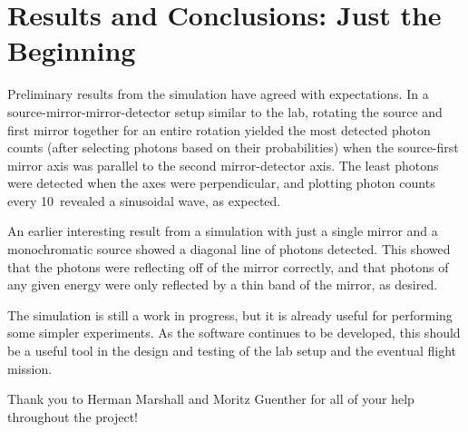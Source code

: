 \documentclass[manuscript]{aastex}
\begin{document}
\section{Results and Conclusions: Just the Beginning}

Preliminary results from the simulation have agreed with expectations. In a source-mirror-mirror-detector setup similar to the lab, rotating the source and first mirror together for an entire rotation yielded the most detected photon counts (after selecting photons based on their probabilities) when the source-first mirror axis was parallel to the second mirror-detector axis. The least photons were detected when the axes were perpendicular, and plotting photon counts every 10\degr\ revealed a sinusoidal wave, as expected.

An earlier interesting result from a simulation with just a single mirror and a monochromatic source showed a diagonal line of photons detected. This showed that the photons were reflecting off of the mirror correctly, and that photons of any given energy were only reflected by a thin band of the mirror, as desired.

The simulation is still a work in progress, but it is already useful for performing some simpler experiments. As the software continues to be developed, this should be a useful tool in the design and testing of the lab setup and the eventual flight mission.

\acknowledgments

Thank you to Herman Marshall and Moritz Guenther for all of your help throughout the project!
\end{document}
